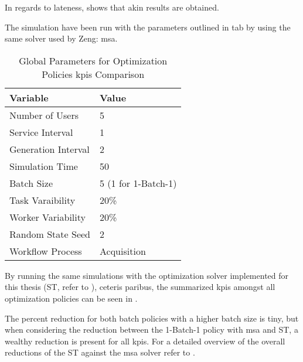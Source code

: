 \documentclass{seal_thesis}
\begin{document}
In regards to lateness,  shows that akin results are obtained.


The simulation have been run with the parameters outlined in tab by using the same solver used by Zeng: \gls{msa}.

\begin{table}[!ht]
\centering
\begin{tabular}{@{}ll@{}}
\toprule
Variable            & Value     \\ \midrule
Number of Users     & 5                 \\
Service Interval    & 1              \\
Generation Interval & 2                 \\
Simulation Time     & 50              \\
Batch Size          & 5 (1 for 1-Batch-1)               \\
Task Varaibility    & 20\%             \\
Worker Variability  & 20\%              \\
Random State Seed   & 2                 \\
Workflow Process    & Acquisition       \\ \bottomrule
\end{tabular}
\caption{Global Parameters for Optimization Policies \glspl{kpi} Comparison}
\label{tab:global_parameters_kpis_comp}
\end{table}

By running the same simulations with the optimization solver implemented for this thesis (\ie ST, refer to ), ceteris paribus, the summarized \glspl{kpi} amongst all optimization policies can be seen in .


The percent reduction for both batch policies with a higher batch size is tiny, but when considering the reduction between the 1-Batch-1 policy with \gls{msa} and ST, a wealthy reduction is present for all \glspl{kpi}. For a detailed overview of the overall reductions of the ST against the \gls{msa} solver refer to .
\end{document}
